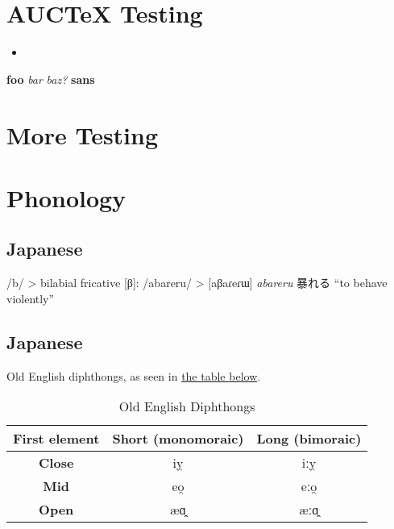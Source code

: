 \documentclass[a4paper,12pt,twoside]{article}
\begin{document}
\section{AUCTeX Testing}
\label{sec:auctex-testing}

\begin{itemize}
\item
\end{itemize}

\textbf{foo}
\textit{bar}
\emph{baz?}
\textbf{sans}

\section{More Testing}
\label{sec:foo-bar-baz}

\section{Phonology}\label{sec:phonology}
\subsection{Japanese}\label{ssec:phonology-japanese}

/b/ > bilabial fricative [β]: /abareru/ > [aβaɾeɾɯ] \textit{abareru} 暴れる ``to behave violently''


\subsection{Japanese}\label{ssec:phonology-oldenglish}


Old English diphthongs, as seen in \hyperref[tab:oe-diphthongs]{the table below}.

\begin{table}
  \caption{Old English Diphthongs}
  \label{tab:oe-diphthongs}

  \begin{tabular}{|c|c|c|}

    \hline
    \textbf{First element} & \textbf{Short (monomoraic)} & \textbf{Long (bimoraic)} \\
    \hline
    \textbf{Close} & iy̯ & iːy̯ \\
    \hline
    \textbf{Mid} & eo̯ & eːo̯ \\
    \hline
    \textbf{Open} & æɑ̯ & æːɑ̯ \\
    \hline

  \end{tabular}

\end{table}
\end{document}
